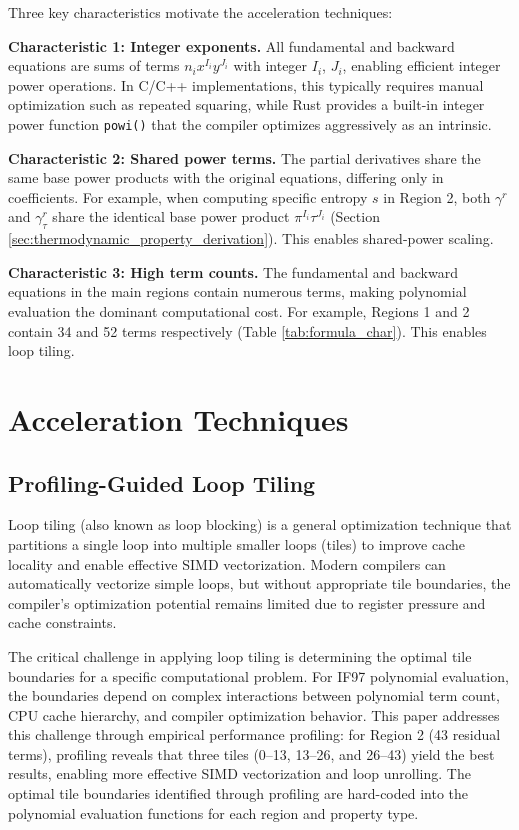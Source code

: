 \documentclass{article}
\begin{document}
Three key characteristics motivate the acceleration techniques:

\textbf{Characteristic 1: Integer exponents.} All fundamental and backward equations are sums of terms $n_i x^{I_i} y^{J_i}$ with integer $I_i$, $J_i$, enabling efficient integer power operations. In C/C++ implementations, this typically requires manual optimization such as repeated squaring, while Rust provides a built-in integer power function \texttt{powi()} that the compiler optimizes aggressively as an intrinsic.

\textbf{Characteristic 2: Shared power terms.} The partial derivatives share the same base power products with the original equations, differing only in coefficients. For example, when computing specific entropy $s$ in Region 2, both $\gamma^r$ and $\gamma^r_\tau$ share the identical base power product $\pi^{I_i}\tau^{J_i}$ (Section \ref{sec:thermodynamic_property_derivation}). This enables shared-power scaling.

\textbf{Characteristic 3: High term counts.} The fundamental and backward equations in the main regions contain numerous terms, 
making polynomial evaluation the dominant computational cost. For example, Regions 1 and 2 contain 34 and 52 terms respectively (Table \ref{tab:formula_char}). 
This enables loop tiling.

\section{Acceleration Techniques}

\subsection{Profiling-Guided Loop Tiling}

Loop tiling (also known as loop blocking) \cite{LoopTiling,Grosser2012Polly} is a general optimization technique that partitions a single loop into multiple smaller loops (tiles) to improve cache locality and enable effective SIMD vectorization. Modern compilers can automatically vectorize simple loops, but without appropriate tile boundaries, the compiler's optimization potential remains limited due to register pressure and cache constraints.

The critical challenge in applying loop tiling is determining the optimal tile boundaries for a specific computational problem. For IF97 polynomial evaluation, the boundaries depend on complex interactions between polynomial term count, CPU cache hierarchy, and compiler optimization behavior. This paper addresses this challenge through empirical performance profiling: for Region 2 (43 residual terms), profiling reveals that three tiles (0--13, 13--26, and 26--43) yield the best results, enabling more effective SIMD vectorization and loop unrolling. The optimal tile boundaries identified through profiling are hard-coded into the polynomial evaluation functions for each region and property type.
\end{document}
